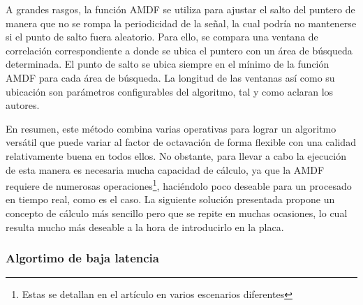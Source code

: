 A grandes rasgos, la función AMDF se utiliza para ajustar el salto del puntero de manera que no se rompa la periodicidad de la señal, la cual podría no mantenerse si el punto de salto fuera aleatorio. Para ello, se compara una ventana de correlación correspondiente a donde se ubica el puntero con un área de búsqueda determinada. El punto de salto se ubica siempre en el mínimo de la función AMDF para cada área de búsqueda. La longitud de las ventanas así como su ubicación son parámetros configurables del algoritmo, tal y como aclaran los autores.

En resumen, este método combina varias operativas para lograr un algoritmo versátil que puede variar al factor de octavación de forma flexible con una calidad relativamente buena en todos ellos. No obstante, para llevar a cabo la ejecución de esta manera es necesaria mucha capacidad de cálculo, ya que la AMDF requiere de numerosas operaciones\footnote{Estas se detallan en el artículo \cite{nfctsm} en varios escenarios diferentes}, haciéndolo poco deseable para un procesado en tiempo real, como es el caso. La siguiente solución presentada propone un concepto de cálculo más sencillo pero que se repite en muchas ocasiones, lo cual resulta mucho más deseable a la hora de introducirlo en la placa.

\subsubsection{Algortimo de baja latencia}
\label{rhilbert}

